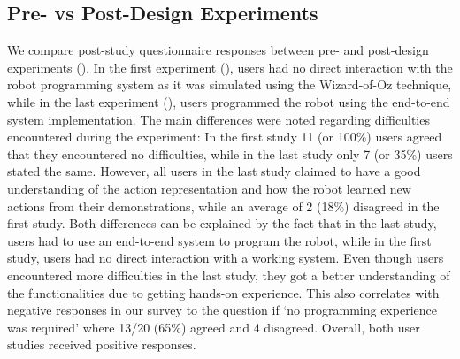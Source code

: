 \subsection{Pre- vs Post-Design Experiments}
We compare post-study questionnaire responses between pre- and post-design experiments ().
In the first experiment (), users had no direct interaction with the robot programming system as it was simulated using the Wizard-of-Oz technique, while in the last experiment (), users programmed the robot using the end-to-end system implementation.
The main differences were noted regarding difficulties encountered during the experiment:
In the first study 11 (or 100\%) users agreed that they encountered no difficulties, while in the last study only 7 (or 35\%) users stated the same.
However, all users in the last study claimed to have a good understanding of the action representation and how the robot learned new actions from their demonstrations, while an average of 2 (18\%) disagreed in the first study.
Both differences can be explained by the fact that in the last study, users had to use an end-to-end system to program the robot, while in the first study, users had no direct interaction with a working system.
Even though users encountered more difficulties in the last study, they got a better understanding of the functionalities due to getting hands-on experience.
This also correlates with negative responses in our survey to the question if `no programming experience was required' where 13/20 (65\%) agreed and 4 disagreed.
Overall, both user studies received positive responses.


